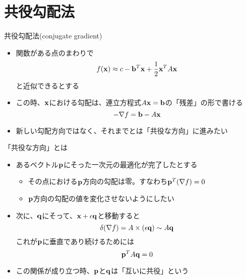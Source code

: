 \section{共役勾配法}

\begin{frame}[t,fragile]{共役勾配法(conjugate gradient)}
  \begin{itemize}
    \setlength{\itemsep}{1em}
  \item 関数がある点のまわりで
    \[
    f({\bf x}) \approx c - {\bf b}^T {\bf x} + \frac{1}{2} {\bf x}^T A {\bf x}
    \]
    と近似できるとする
  \item この時、${\bf x}$における勾配は、連立方程式$A{\bf x}={\bf b}$の「残差」の形で書ける
    \[
    -\nabla f = {\bf b} - A {\bf x}
    \]
  \item 新しい勾配方向ではなく、それまでとは「共役な方向」に進みたい
  \end{itemize}
\end{frame}

\begin{frame}[t,fragile]{「共役な方向」とは}
  \begin{itemize}
    \setlength{\itemsep}{1em}
  \item あるベクトル${\bf p}$にそった一次元の最適化が完了したとする
    \begin{itemize}
    \item その点における${\bf p}$方向の勾配は零。すなわち${\bf p}^T (\nabla f)=0$
    \item ${\bf p}$方向の勾配の値を変化させないようにしたい
  \end{itemize}
  \item 次に、${\bf q}$にそって、${\bf x}+\epsilon {\bf q}$と移動すると
    \[
      \delta(\nabla f) = A \times (\epsilon {\bf q}) \sim A {\bf q}
      \]
      これが${\bf p}$に垂直であり続けるためには
    \[
      {\bf p}^T A {\bf q} = 0
      \]
    \item この関係が成り立つ時、${\bf p}$と${\bf q}$は「互いに共役」という
  \end{itemize}
\end{frame}

